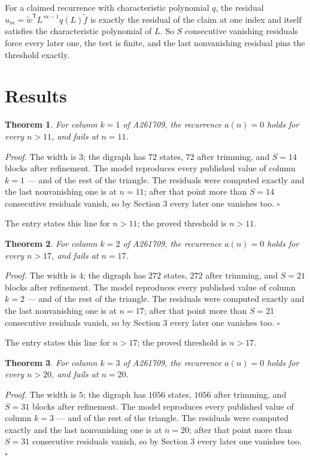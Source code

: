 \documentclass[11pt]{article}
\newtheorem{theorem}{Theorem}
\theoremstyle{definition}
\begin{document}
For a claimed recurrence with characteristic polynomial $q$, the residual $u_m = \tilde w^{\mathsf T}L^{\,m-1}q(L)\tilde f$ is exactly the residual of the claim at one index and itself satisfies the characteristic polynomial of $L$. So $S$ consecutive vanishing residuals force every later one, the test is finite, and the last nonvanishing residual pins the threshold exactly.

\section{Results}

\begin{theorem} For column $k = 1$ of A261709, the recurrence $a(n) = 0$ holds for every $n > 11$, and fails at $n = 11$.\end{theorem}

{\itshape Proof.} The width is $3$; the digraph has $72$ states, $72$ after trimming, and $S = 14$ blocks after refinement. The model reproduces every published value of column $k = 1$ --- and of the rest of the triangle. The residuals were computed exactly and the last nonvanishing one is at $n = 11$; after that point more than $S = 14$ consecutive residuals vanish, so by Section 3 every later one vanishes too. $\square$

The entry states this line for $n > 11$; the proved threshold is $n > 11$.

\begin{theorem} For column $k = 2$ of A261709, the recurrence $a(n) = 0$ holds for every $n > 17$, and fails at $n = 17$.\end{theorem}

{\itshape Proof.} The width is $4$; the digraph has $272$ states, $272$ after trimming, and $S = 21$ blocks after refinement. The model reproduces every published value of column $k = 2$ --- and of the rest of the triangle. The residuals were computed exactly and the last nonvanishing one is at $n = 17$; after that point more than $S = 21$ consecutive residuals vanish, so by Section 3 every later one vanishes too. $\square$

The entry states this line for $n > 17$; the proved threshold is $n > 17$.

\begin{theorem} For column $k = 3$ of A261709, the recurrence $a(n) = 0$ holds for every $n > 20$, and fails at $n = 20$.\end{theorem}

{\itshape Proof.} The width is $5$; the digraph has $1056$ states, $1056$ after trimming, and $S = 31$ blocks after refinement. The model reproduces every published value of column $k = 3$ --- and of the rest of the triangle. The residuals were computed exactly and the last nonvanishing one is at $n = 20$; after that point more than $S = 31$ consecutive residuals vanish, so by Section 3 every later one vanishes too. $\square$
\end{document}
